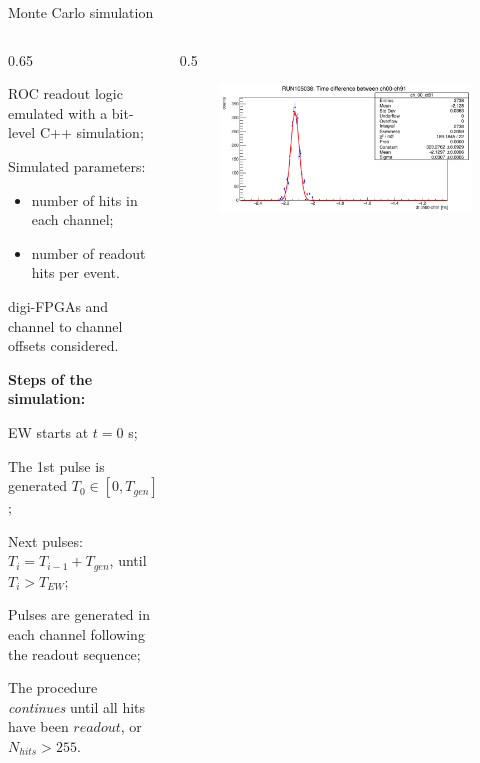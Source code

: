 \documentclass{beamer}
\begin{document}
    \begin{frame}{Monte Carlo simulation}
                 \vspace{-3mm}
    \begin{columns}
  \begin{column}{0.65\framewidth} 
        \begin{itemize}
        {\small
            \item ROC readout logic emulated with a bit-level C++ simulation;
            \item Simulated parameters:
            \begin{itemize}
                \item number of hits in each channel;
                \item number of readout hits per event.
            \end{itemize}
            \item digi-FPGAs and channel to channel offsets considered. }
        \end{itemize}
       {\small  \textbf{Steps of the simulation:}}
\begin{itemize}
 {\small
\item EW starts at $t=0$ s;
  \item The 1st pulse is generated $T_0\in [0 ,T_{gen}]$;
    \item Next pulses: $T_i = T_{i-1} + T_{gen}$, until $T_i> T_{EW}$;
\item Pulses are generated in each channel following the readout sequence;
  \item The procedure \textit{continues} until all hits 
  have been $readout$, or $N_{hits}>255$. }
\end{itemize}
    \end{column}
     \begin{column}{0.5\framewidth} 
      \begin{figure}[H]
          \centering
      \includegraphics[width=\columnwidth]{figures/png/Screenshot from 2023-12-03 11-50-50.png}

\end{figure}
\end{column}
\end{columns}
\end{frame}
\end{document}

